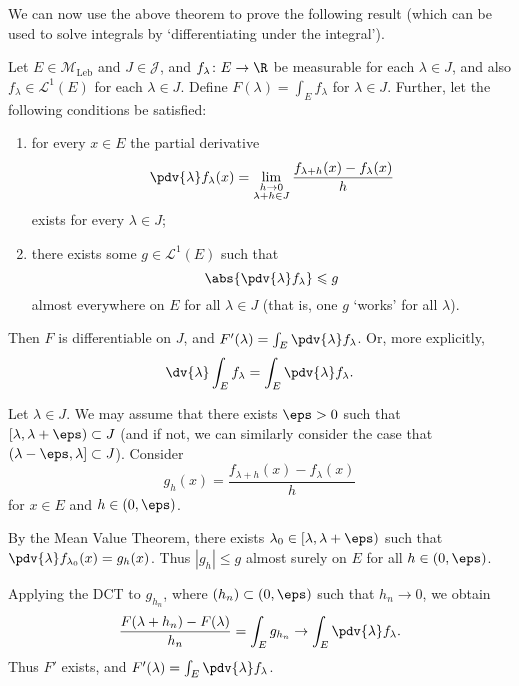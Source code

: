 \documentclass{maths}
\newcommand{\mleb}{\mathcal{M}_{\text{Leb}}}
\newcommand{\intvl}{\mathcal{J}}
\begin{document}
We can now use the above theorem to prove the following result (which can be used to solve integrals by `differentiating under the integral').

\begin{thm}
    Let $E\in\mleb$ and $J\in\intvl$, and $f_\lambda\colon E\to\R$ be measurable for each $\lambda\in J$, and also $f_\lambda\in \mathcal{L}^1(E)$ for each $\lambda\in J$.
    Define $F(\lambda)=\int_E f_\lambda$ for $\lambda\in J$.
    Further, let the following conditions be satisfied:
    \begin{enumerate}
        \item for every $x\in E$ the partial derivative
        \[
            \pdv{\lambda} f_\lambda(x) =
            \lim_{\substack{h\to0\\\lambda+h\in J}} \frac{f_{\lambda+h}(x) - f_\lambda(x)}{h}
        \]
        exists for every $\lambda\in J$;
        \item there exists some $g\in \mathcal{L}^1(E)$ such that
        \[
            \abs{\pdv{\lambda} f_\lambda} \leqslant
            g
        \]
        almost everywhere on $E$ for all $\lambda\in J$ (that is, one $g$ `works' for all $\lambda$).
    \end{enumerate}
    Then $F$ is differentiable on $J$, and $F'(\lambda)=\int_E \pdv{\lambda} f_\lambda$.
    Or, more explicitly,
    \[
        \dv{\lambda} \int_E f_\lambda =
        \int_E \pdv{\lambda} f_\lambda.
    \]
\end{thm}

\begin{prf}
    Let $\lambda\in J$.
    We may assume that there exists $\eps>0$ such that $[\lambda,\lambda+\eps)\subset J$ (and if not, we can similarly consider the case that $(\lambda-\eps,\lambda]\subset J$).
    Consider
    \[
        g_h(x) =
        \frac{f_{\lambda+h}(x) - f_\lambda(x)}{h}
    \]
    for $x\in E$ and $h\in(0,\eps)$.

    By the Mean Value Theorem, there exists $\lambda_0\in[\lambda,\lambda+\eps)$ such that $\pdv{\lambda}f_{\lambda_0}(x)=g_h(x)$.
    Thus $|g_h|\leqslant g$ almost surely on $E$ for all $h\in(0,\eps)$.

    Applying the DCT to $g_{h_n}$, where $(h_n)\subset(0,\eps)$ such that $h_n\to0$, we obtain
    \[
        \frac{F(\lambda+h_n) - F(\lambda)}{h_n} =
        \int_E g_{h_n} \to
        \int_E \pdv{\lambda} f_\lambda.
    \]
    Thus $F'$ exists, and $F'(\lambda)=\int_E\pdv{\lambda}f_\lambda$.
\end{prf}
\end{document}
